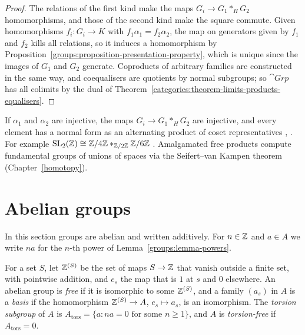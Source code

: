 \begin{proof}
The relations of the first kind make the maps $G_i \to G_1 *_H G_2$ homomorphisms, and
those of the second kind make the square commute. Given homomorphisms
$f_i \colon G_i \to K$ with $f_1\alpha_1 = f_2\alpha_2$, the map on generators given by $f_1$
and $f_2$ kills all relations, so it induces a homomorphism by
Proposition~\ref{groups:proposition-presentation-property}, which is unique since the
images of $G_1$ and $G_2$ generate. Coproducts of arbitrary families are
constructed in the same way, and coequalisers are quotients by normal subgroups;
so $\cat{Grp}$ has all colimits by the dual of
Theorem~\ref{categories:theorem-limits-products-equalisers}.
\end{proof}

\begin{remark}\label{groups:remark-normal-form}
If $\alpha_1$ and $\alpha_2$ are injective, the maps $G_i \to G_1 *_H G_2$ are injective,
and every element has a normal form as an alternating product of coset
representatives \cite[Chapter I, Theorem 1]{serre-trees},
\cite[Chapter IV]{lyndon-schupp}. For example
$\mathrm{SL}_2(\mathbb{Z}) \cong \mathbb{Z}/4\mathbb{Z} *_{\mathbb{Z}/2\mathbb{Z}} \mathbb{Z}/6\mathbb{Z}$ \cite[Chapter I, \S 4]{serre-trees}.
Amalgamated free products compute fundamental groups of unions of spaces via the
Seifert--van Kampen theorem (Chapter~\ref{homotopy}).
\end{remark}

\section{Abelian groups}\label{groups:section-abelian}

In this section groups are abelian and written additively. For $n \in \mathbb{Z}$ and
$a \in A$ we write $na$ for the $n$-th power of Lemma~\ref{groups:lemma-powers}.

\begin{definition}\label{groups:definition-free-abelian}
For a set $S$, let $\mathbb{Z}^{(S)}$ be the set of maps $S \to \mathbb{Z}$ that vanish outside a
finite set, with pointwise addition, and $e_s$ the map that is $1$ at $s$ and $0$
elsewhere. An abelian group is \emph{free} if it is isomorphic to some $\mathbb{Z}^{(S)}$,
and a family $(a_s)$ in $A$ is a \emph{basis} if the homomorphism
$\mathbb{Z}^{(S)} \to A$, $e_s \mapsto a_s$, is an isomorphism. The \emph{torsion subgroup} of $A$
is $A_{\mathrm{tors}} = \{a : na = 0 \text{ for some } n \geq 1\}$, and $A$ is
\emph{torsion-free} if $A_{\mathrm{tors}} = 0$.
\end{definition}

